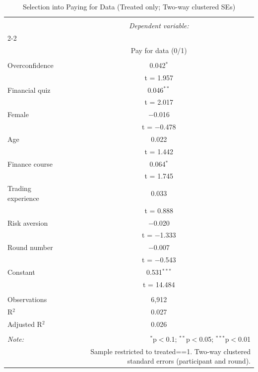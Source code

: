
\begin{table}[!htbp] \centering 
  \caption{Selection into Paying for Data (Treated only; Two-way clustered SEs)} 
  \label{} 
\begin{tabular}{@{\extracolsep{5pt}}lc} 
\\[-1.8ex]\hline 
\hline \\[-1.8ex] 
 & \multicolumn{1}{c}{\textit{Dependent variable:}} \\ 
\cline{2-2} 
\\[-1.8ex] & Pay for data (0/1) \\ 
\hline \\[-1.8ex] 
 Overconfidence & 0.042$^{*}$ \\ 
  & t = 1.957 \\ 
  Financial quiz & 0.046$^{**}$ \\ 
  & t = 2.017 \\ 
  Female & $-$0.016 \\ 
  & t = $-$0.478 \\ 
  Age & 0.022 \\ 
  & t = 1.442 \\ 
  Finance course & 0.064$^{*}$ \\ 
  & t = 1.745 \\ 
  Trading experience & 0.033 \\ 
  & t = 0.888 \\ 
  Risk aversion & $-$0.020 \\ 
  & t = $-$1.333 \\ 
  Round number & $-$0.007 \\ 
  & t = $-$0.543 \\ 
  Constant & 0.531$^{***}$ \\ 
  & t = 14.484 \\ 
 \hline \\[-1.8ex] 
Observations & 6,912 \\ 
R$^{2}$ & 0.027 \\ 
Adjusted R$^{2}$ & 0.026 \\ 
\hline 
\hline \\[-1.8ex] 
\textit{Note:}  & \multicolumn{1}{r}{$^{*}$p$<$0.1; $^{**}$p$<$0.05; $^{***}$p$<$0.01} \\ 
 & \multicolumn{1}{r}{Sample restricted to treated==1. Two-way clustered standard errors (participant and round).} \\ 
\end{tabular} 
\end{table} 
